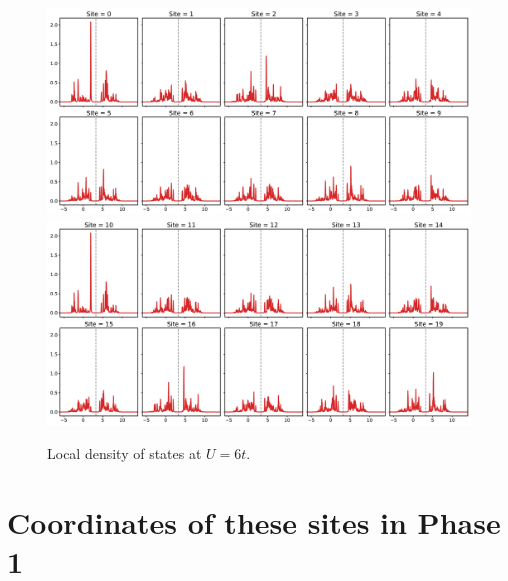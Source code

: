 \documentclass[aps,prb,reprint,amsfonts,amsmath,amssymb,showpacs,groupedaddress,superscriptaddress,onecolumn]{revtex4-1}
\begin{document}
\begin{figure}[p]
    \centering
    \includegraphics[width=0.8\columnwidth]{CPTForPhase1LDOS0.pdf}
    \includegraphics[width=0.8\columnwidth]{CPTForPhase1LDOS1.pdf}
    \caption{\label{fig:CPTForPhase1LDOS} Local density of states at $U = 6t$.}
\end{figure}

\appendix

\section{\label{appx:Coordinates}Coordinates of these sites in Phase 1}
\end{document}
